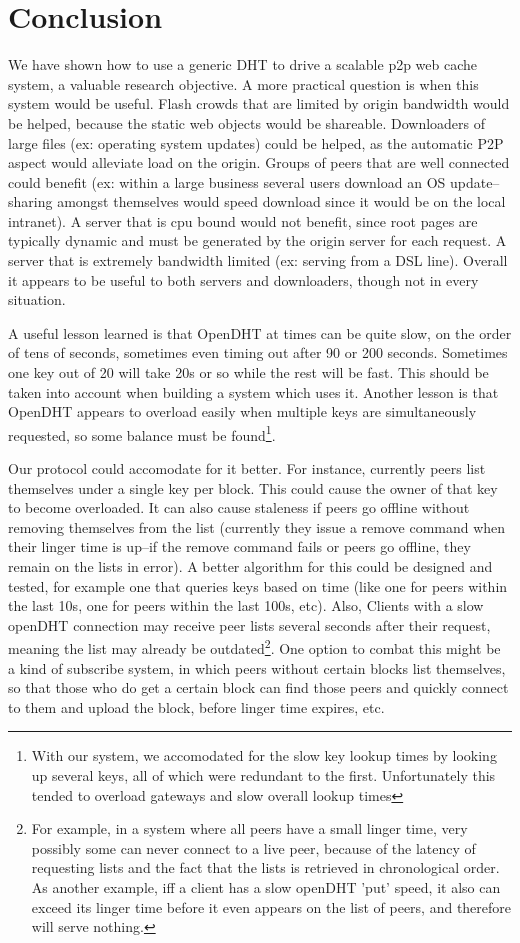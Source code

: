 
\section{Conclusion}
We have shown how to use a generic DHT to drive a scalable p2p web cache system, a valuable research objective.  A more practical question is when this system would be useful.  Flash crowds that are limited by origin bandwidth would be helped, because the static web objects would be shareable.  Downloaders of large files (ex: operating system updates) could be helped, as the automatic P2P aspect would alleviate load on the origin.  Groups of peers that are well connected could benefit (ex: within a large business several users download an OS update--sharing amongst themselves would speed download since it would be on the local intranet).  A server that is cpu bound would not benefit, since root pages are typically dynamic and must be generated by the origin server for each request.  A server that is extremely bandwidth limited (ex: serving from a DSL line).  Overall it appears to be useful to both servers and downloaders, though not in every situation.

A useful lesson learned is that OpenDHT at times can be quite slow, on the order of tens of seconds, sometimes even timing out after 90 or 200 seconds.  Sometimes one key out of 20 will take 20s or so while the rest will be fast.  This should be taken into account when building a system which uses it.  Another lesson is that OpenDHT appears to overload easily when multiple keys are simultaneously requested, so some balance must be found\footnote{With our system, we accomodated for the slow key lookup times by looking up several keys, all of which were redundant to the first.  Unfortunately this tended to overload gateways and slow overall lookup times}.

Our protocol could accomodate for it better.  For instance, currently peers list themselves under a single key per block.  This could cause the owner of that key to become overloaded.  It can also cause staleness if peers go offline without removing themselves from the list (currently they issue a remove command when their linger time is up--if the remove command fails or peers go offline, they remain on the lists in error).  A better algorithm for this could be designed and tested, for example one that queries keys based on time (like one for peers within the last 10s, one for peers within the last 100s, etc).  Also, Clients with a slow openDHT connection may receive peer lists several seconds after their request, meaning the list may already be outdated\footnote{For example, in a system where all peers have a small linger time, very possibly some can never connect to a live peer, because of the latency of requesting lists and the fact that the lists is retrieved in chronological order.  As another example, iff a client has a slow openDHT 'put' speed, it also can exceed its linger time before it even appears on the list of peers, and therefore will serve nothing.}.  One option to combat this might be a kind of subscribe system, in which peers without certain blocks list themselves, so that those who do get a certain block can find those peers and quickly connect to them and upload the block, before linger time expires, etc.

